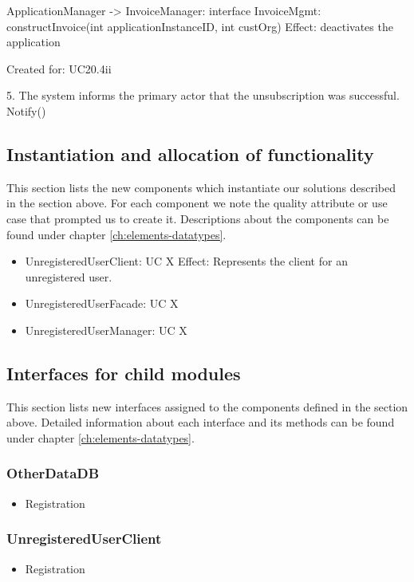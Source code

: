 {{{{{{{{            ApplicationManager -> InvoiceManager: interface InvoiceMgmt: constructInvoice(int applicationInstanceID, int custOrg)
                Effect: deactivates the application
                \item Created for: UC20.4ii

        5. The system informs the primary actor that the unsubscription was successful.
            Notify()


\subsection{Instantiation and allocation of functionality}
    This section lists the new components which instantiate our solutions
    described in the section above. For each component we note the quality
    attribute or use case that prompted us to create it. Descriptions about
    the components can be found under chapter \ref{ch:elements-datatypes}. \\

    \begin{itemize}
        \item UnregisteredUserClient: UC X
              Effect: Represents the client for an unregistered user.
        \item UnregisteredUserFacade: UC X
        \item UnregisteredUserManager: UC X
    \end{itemize}


\subsection{Interfaces for child modules}
    This section lists new interfaces assigned to the components defined
    in the section above. Detailed information about each interface and
    its methods can be found under chapter \ref{ch:elements-datatypes}. \\

    \subsubsection{OtherDataDB}
        \begin{itemize}
            \item Registration
        \end{itemize}
    \subsubsection{UnregisteredUserClient}
        \begin{itemize}
            \item Registration
        \end{itemize}
}}}}}}}}
